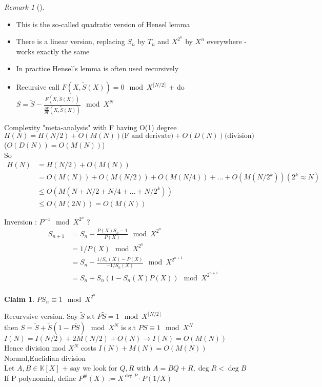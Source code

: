 \documentclass{article}
\newtheorem{claim}{Claim}
\theoremstyle{definition}
\theoremstyle{remark}
\newtheorem*{remark}{Remark}
\newcommand{\Rem}[3]{\begin{remark}[#1]\label{#2}#3\end{remark}}
\newcommand{\K}{\mathbb{K}}
\begin{document}
\Rem{}{}{\begin{itemize}
		\item This is the so-called quadratic version of Hensel lemma
		\item There is a linear version, replacing $S_n$ by $T_n$ and $X^{2^{n}}$ by $X^n$ everywhere - works exactly the same
		\item In practice Hensel's lemma is often used recursively
		\item Recursive call $F(X,\tilde{S}(X)) = 0 \mod X^{\lceil N/2 \rceil}$ + do $S = \tilde{S} - \frac{F(X,\tilde{S}(X))}{\frac{\partial F}{\partial Y}(X,\tilde{S}(X))} \mod X^{N}$
	\end{itemize}}
Complexity "meta-analysis" with F having O(1) degree\\
$H(N) = H(N/2) + O(M(N))\text{(F and derivate)} + O(D(N))\text{(division)}$\\
($O(D(N)) = O(M(N))$)\\
So \begin{align*}
H(N) & = H(N/2) + O(M(N))\\
& = O(M(N)) + O(M(N/2)) + O(M(N/4)) + ... + O(M(N/2^k)) (2^k \approx N)\\
& \leq O(M(N+N/2+N/4+\dots+N/2^k))\\
& \leq O(M(2N)) = O(M(N))
\end{align*}

Inversion : $P^{-1} \mod X^{2^n}$ ?\\
\begin{align*}
S_{n+1} & = S_n - \frac{P(X)S_n - 1}{P(X)} \mod X^{2^n}\\
& = 1/P(X) \mod X^{2^n}\\
& = S_n - \frac{1/S_n(X) - P(X)}{-1/S_n(X)} \mod X^{2^{n+1}}\\
& = S_n + S_n(1 - S_n(X)P(X)) \mod X^{2^{n+1}}\\
\end{align*}
\begin{claim}
	$PS_n \equiv 1 \mod X^{2^n}$
\end{claim}
Recurvsive version. Say $\tilde{S}$ s.t $P\tilde{S} = 1 \mod X^{\lceil N/2 \rceil}$\\
then $S = \tilde{S} + \tilde{S}(1 - P\tilde{S}) \mod X^{N}$ is s.t $PS \equiv 1 \mod X^N$\\$I(N) = I(N/2) + 2M(N/2) + O(N) \rightarrow I(N) = O(M(N))$\\
Hence division mod $X^N$ costs $I(N)+M(N) = O(M(N))$\\

Normal,Euclidian division\\
Let $A,B \in \K[X]$ + say we look for $Q,R$ with $A = BQ + R, \deg R < \deg B$\\
If P polynomial, define $P^{\#}(X):=X^{\deg P}\cdot P(1/X)$
\end{document}
